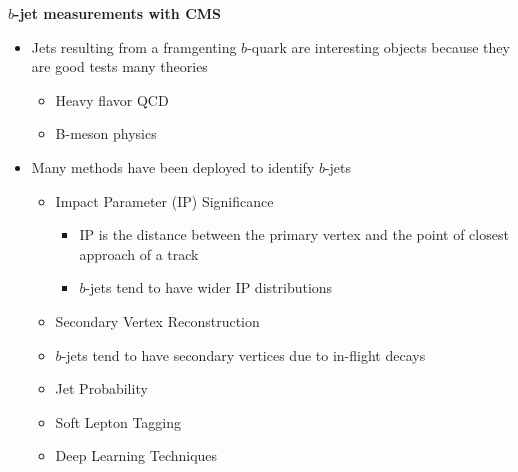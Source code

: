 \begin{frame}
  \centering \textbf{$b$-jet measurements with CMS}
  \begin{itemize}
  \item Jets resulting from a framgenting $b$-quark are interesting objects because they are good tests many theories
    \begin{itemize}
    \item Heavy flavor QCD
    \item B-meson physics
    \end{itemize}
  \item Many methods have been deployed to identify $b$-jets
    \begin{itemize}
    \item Impact Parameter (IP) Significance
      \begin{itemize}
      \item IP is the distance between the primary vertex and the point of closest approach of a track
      \item $b$-jets tend to have wider IP distributions
      \end{itemize}
    \item Secondary Vertex Reconstruction
    \item $b$-jets tend to have secondary vertices due to in-flight decays
    \item Jet Probability
    \item Soft Lepton Tagging
    \item Deep Learning Techniques
    \end{itemize}
  \end{itemize}
\end{frame}
